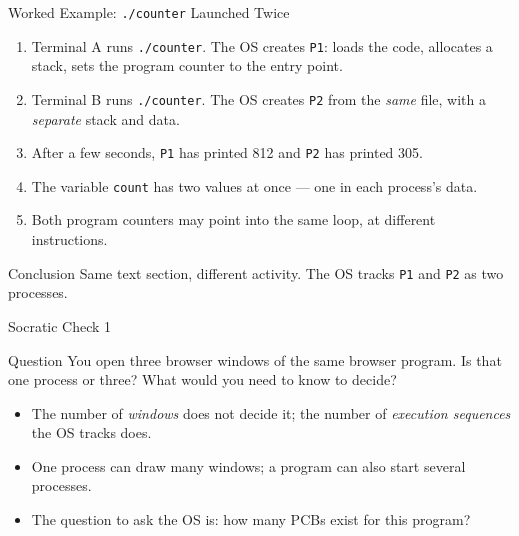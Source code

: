 \documentclass[aspectratio=169]{beamer}
\begin{document}
\begin{frame}{Worked Example: \texttt{./counter} Launched Twice}
  \begin{enumerate}
    \item Terminal A runs \texttt{./counter}. The OS creates \texttt{P1}:
      loads the code, allocates a stack, sets the program counter to the entry
      point.
    \item Terminal B runs \texttt{./counter}. The OS creates \texttt{P2}
      from the \emph{same} file, with a \emph{separate} stack and data.
    \item After a few seconds, \texttt{P1} has printed 812 and \texttt{P2}
      has printed 305.
    \item The variable \texttt{count} has two values at once --- one in each
      process's data.
    \item Both program counters may point into the same loop, at different
      instructions.
  \end{enumerate}
  \vspace{0.1cm}
  \begin{exampleblock}{Conclusion}
    Same text section, different activity. The OS tracks \texttt{P1} and
    \texttt{P2} as two processes.
  \end{exampleblock}
\end{frame}

\begin{frame}{Socratic Check 1}
  \begin{block}{Question}
    You open three browser windows of the same browser program. Is that one
    process or three? What would you need to know to decide?
  \end{block}
  \vspace{0.25cm}
  \begin{itemize}
    \item The number of \emph{windows} does not decide it; the number of
      \emph{execution sequences} the OS tracks does.
    \item One process can draw many windows; a program can also start several
      processes.
    \item The question to ask the OS is: how many PCBs exist for this program?
  \end{itemize}
\end{frame}

\end{document}
